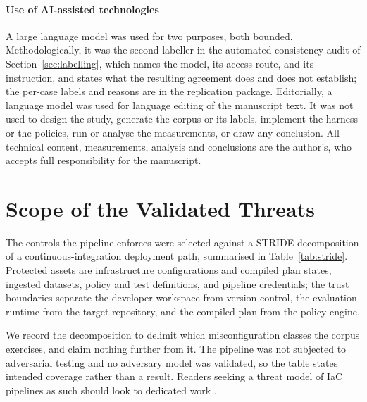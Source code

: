 \documentclass[smallextended]{svjour3}
\begin{document}
\paragraph{Use of AI-assisted technologies} A large language model was used for
two purposes, both bounded. Methodologically, it was the second labeller in the
automated consistency audit of Section~\ref{sec:labelling}, which names the model,
its access route, and its instruction, and states what the resulting agreement
does and does not establish; the per-case labels and reasons are in the
replication package. Editorially, a language model was used for language editing
of the manuscript text. It was not used to design the study, generate the corpus
or its labels, implement the harness or the policies, run or analyse the
measurements, or draw any conclusion. All technical content, measurements,
analysis and conclusions are the author's, who accepts full responsibility for the
manuscript.

\appendix
\section{Scope of the Validated Threats}
\label{app:threats}

The controls the pipeline enforces were selected against a STRIDE decomposition
\citep{shostack2014threat} of a continuous-integration deployment path,
summarised in Table~\ref{tab:stride}. Protected assets are infrastructure
configurations and compiled plan states, ingested datasets, policy and test
definitions, and pipeline credentials; the trust boundaries separate the developer
workspace from version control, the evaluation runtime from the target
repository, and the compiled plan from the policy engine.

We record the decomposition to delimit which misconfiguration classes the corpus
exercises, and claim nothing further from it. The pipeline was not subjected to
adversarial testing and no adversary model was validated, so the table states
intended coverage rather than a result. Readers seeking a threat model of IaC
pipelines as such should look to dedicated work \citep{shamim2020xi}.
\end{document}
